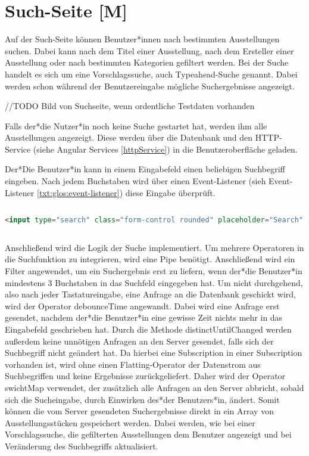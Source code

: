 \section{Such-Seite [M]}
Auf der Such-Seite können Benutzer*innen nach bestimmten Ausstellungen suchen. Dabei kann nach dem Titel einer Ausstellung, nach dem Ersteller einer Ausstellung oder nach bestimmten Kategorien gefiltert werden. Bei der Suche handelt es sich um eine Vorschlagssuche, auch Typeahead-Suche genannt. Dabei werden schon während der Benutzereingabe mögliche Suchergebnisse angezeigt.

//TODO Bild von Suchseite, wenn ordentliche Testdaten vorhanden

Falls der*die Nutzer*in noch keine Suche gestartet hat, werden ihm alle Ausstellungen angezeigt. Diese werden über die Datenbank und den HTTP-Service (siehe Angular Services \ref{httpService}) in die Benutzeroberfläche geladen. 

Der*Die Benutzer*in kann in einem Eingabefeld einen beliebigen Suchbegriff eingeben. Nach jedem Buchstaben wird über einen Event-Listener (sieh Event-Listener \ref{txt:glos:event-listener}) diese Eingabe überprüft. 

\begin{lstlisting}[caption={Eingabefeld},language=HTML]
    
<input type="search" class="form-control rounded" placeholder="Search" #input (keyup)="keyUp$.next(input.value)">
    
\end{lstlisting}

Anschließend wird die Logik der Suche implementiert. Um mehrere Operatoren in die Suchfunktion zu integrieren, wird eine Pipe benötigt. Anschließend wird ein Filter angewendet, um ein Suchergebnis erst zu liefern, wenn der*die Benutzer*in mindestens 3 Buchstaben in das Suchfeld eingegeben hat. Um nicht durchgehend, also nach jeder Tastatureingabe, eine Anfrage an die Datenbank geschickt wird, wird der Operator debounceTime angewandt. Dabei wird eine Anfrage erst gesendet, nachdem der*die Benutzer*in eine gewisse Zeit nichts mehr in das Eingabefeld geschrieben hat. Durch die Methode distinctUntilChanged werden außerdem keine unnötigen Anfragen an den Server gesendet, falls sich der Suchbegriff nicht geändert hat. Da hierbei eine Subscription in einer Subscription vorhanden ist, wird ohne einen Flatting-Operator der Datenstrom aus Suchbegriffen und keine Ergebnisse zurückgeliefert. Daher wird der Operator swichtMap verwendet, der zusätzlich alle Anfragen an den Server abbricht, sobald sich die Sucheingabe, durch Einwirken des*der Benutzers*in, ändert. Somit können die vom Server gesendeten Suchergebnisse direkt in ein Array von Ausstellungsstücken gespeichert werden. Dabei werden, wie bei einer Vorschlagssuche, die gefilterten Ausstellungen dem Benutzer angezeigt und bei Veränderung des Suchbegriffs aktualisiert.

